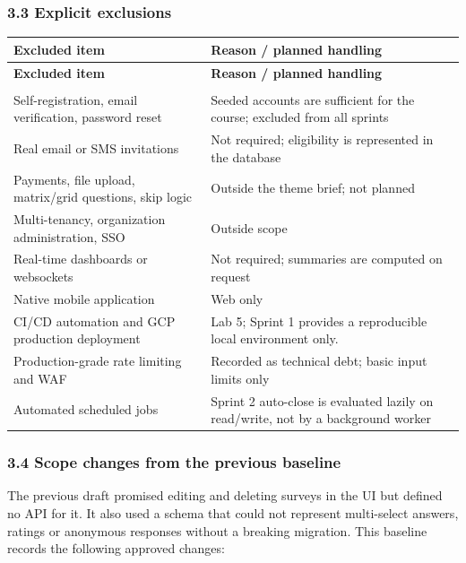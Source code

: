 \documentclass[12pt,a4paper]{article}
\begin{document}
\subsubsection*{3.3 Explicit exclusions}
{\setlength{\tabcolsep}{3pt}\renewcommand{\arraystretch}{1.08}\small
\begin{longtable}{@{}>{\raggedright\arraybackslash}p{}>{\raggedright\arraybackslash}p{}@{}}
\toprule
\textbf{Excluded item} & \textbf{Reason / planned handling} \\
\midrule
\endfirsthead
\toprule
\textbf{Excluded item} & \textbf{Reason / planned handling} \\
\midrule
\endhead
\midrule
\multicolumn{2}{r}{\footnotesize\textit{Continued on next page}}\\
\endfoot
\bottomrule
\endlastfoot
Self-registration, email verification, password reset & Seeded accounts are sufficient for the course; excluded from all sprints \\
Real email or SMS invitations & Not required; eligibility is represented in the database \\
Payments, file upload, matrix/grid questions, skip logic & Outside the theme brief; not planned \\
Multi-tenancy, organization administration, SSO & Outside scope \\
Real-time dashboards or websockets & Not required; summaries are computed on request \\
Native mobile application & Web only \\
CI/CD automation and GCP production deployment & Lab 5; Sprint 1 provides a reproducible local environment only. \\
Production-grade rate limiting and WAF & Recorded as technical debt; basic input limits only \\
Automated scheduled jobs & Sprint 2 auto-close is evaluated lazily on read/write, not by a background worker \\
\end{longtable}}

\subsubsection*{3.4 Scope changes from the previous baseline}
The previous draft promised editing and deleting surveys in the UI but defined no API for it. It also used a schema that could not represent multi-select answers, ratings or anonymous responses without a breaking migration. This baseline records the following approved changes:
\end{document}
